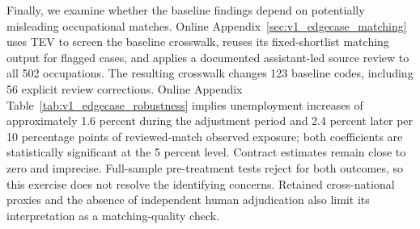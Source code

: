 Finally, we examine whether the baseline findings depend on potentially misleading occupational matches. Online Appendix~\ref{sec:v1_edgecase_matching} uses TEV to screen the baseline crosswalk, reuses its fixed-shortlist matching output for flagged cases, and applies a documented assistant-led source review to all 502 occupations. The resulting crosswalk changes 123 baseline codes, including 56 explicit review corrections. Online Appendix Table~\ref{tab:v1_edgecase_robustness} implies unemployment increases of approximately 1.6 percent during the adjustment period and 2.4 percent later per 10 percentage points of reviewed-match observed exposure; both coefficients are statistically significant at the 5 percent level. Contract estimates remain close to zero and imprecise. Full-sample pre-treatment tests reject for both outcomes, so this exercise does not resolve the identifying concerns. Retained cross-national proxies and the absence of independent human adjudication also limit its interpretation as a matching-quality check.
